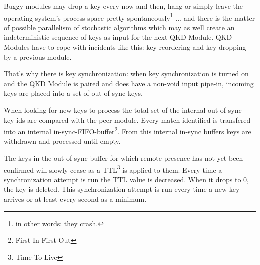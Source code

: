 \medskip

Buggy modules may drop a key every now and then, hang or simply leave the operating system's process space pretty spontaneously\footnote{in other words: they crash.} ... and there is the matter of possible parallelism of stochastic algorithms which may as well create an indeterministic sequence of keys as input for the next QKD Module. QKD Modules have to cope with incidents like this: key reordering and key dropping by a previous module.

\medskip

That's why there is key synchronization: when key synchronization is turned on and the QKD Module is paired and does have a non-void input pipe-in, incoming keys are placed into a set of out-of-sync keys.

\medskip

When looking for new keys to process the total set of the internal out-of-sync key-ids are compared with the peer module. Every match identified is transfered into an internal in-sync-FIFO-buffer\footnote{First-In-First-Out}. From this internal in-sync buffers keys are withdrawn and processed until empty.

\medskip

The keys in the out-of-sync buffer for which remote presence has not yet been confirmed will slowly cease as a TTL\footnote{Time To Live} is applied to them. Every time a synchronization attempt is run the TTL value is decreased. When it drops to 0, the key is deleted. This synchronization attempt is run every time a new key arrives or at least every second as a minimum.

